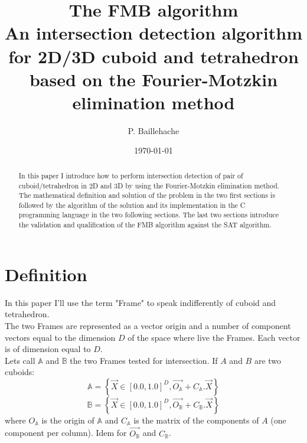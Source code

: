 \documentclass[12pt, a4paper]{article}
\begin{document}
\title{The FMB algorithm\\An intersection detection algorithm for 2D/3D cuboid and tetrahedron based on the Fourier-Motzkin elimination method}
\author{P. Baillehache}
\date{\today}
\maketitle

\begin{abstract}
In this paper I introduce how to perform intersection detection of pair of cuboid/tetrahedron in 2D and 3D by using the Fourier-Motzkin elimination method. The mathematical definition and solution of the problem in the two first sections is followed by the algorithm of the solution and its implementation in the C programming language in the two following sections. The last two sections introduce the validation and qualification of the FMB algorithm against the SAT algorithm.
\end{abstract}

\newpage
\tableofcontents

\section{Definition}

In this paper I'll use the term "Frame" to speak indifferently of cuboid and tetrahedron.\\

The two Frames are represented as a vector origin and a number of component vectors equal to the dimension $D$ of the space where live the Frames. Each vector is of dimension equal to $D$.\\

Lets call $\mathbb{A}$ and $\mathbb{B}$ the two Frames tested for intersection. If $A$ and $B$ are two cuboids:
\begin{equation}
\mathbb{A}=\left\lbrace\overrightarrow{X}\in[0.0,1.0]^D,\overrightarrow{O_\mathbb{A}}+C_\mathbb{A}.\overrightarrow{X}\right\rbrace
\end{equation}
\begin{equation}
\mathbb{B}=\left\lbrace\overrightarrow{X}\in[0.0,1.0]^D,\overrightarrow{O_\mathbb{B}}+C_\mathbb{B}.\vec{X}\right\rbrace
\end{equation}
where $O_\mathbb{A}$ is the origin of $\mathbb{A}$ and $C_\mathbb{A}$ is the matrix of the components of $A$ (one component per column). Idem for $\overrightarrow{O_\mathbb{B}}$ and $C_\mathbb{B}$.\\
\end{document}
